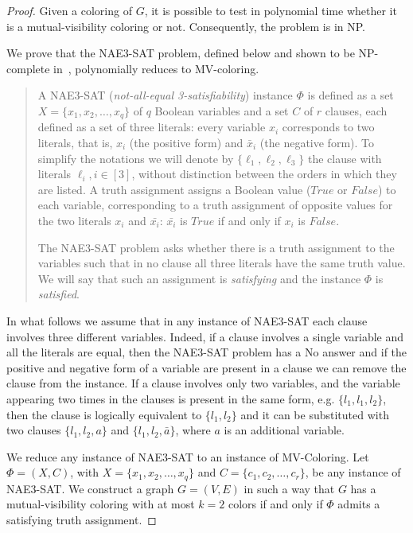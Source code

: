 \documentclass[12pt]{article}
\begin{document}
\begin{proof} 
 Given a coloring of $G$, it is possible to test in polynomial time whether it is a mutual-visibility coloring or not. Consequently, the problem is in NP. 
 
 We prove that the {\sc NAE3-SAT} problem, defined below and shown to be NP-complete in~\cite{schafer-1978}, polynomially reduces to {\sc MV-coloring}.
 \begin{quote}  
 A {\sc NAE3-SAT} (\emph{not-all-equal 3-satisfiability}) instance $\Phi$ is defined as a set $X=\{x_1,x_2,\ldots,x_q\}$ of $q$ Boolean variables and a set $C$ of $r$ clauses, each  defined as a set of three literals: every variable $x_i$ corresponds to two literals, that is, $x_i$ (the positive form) and $\bar x_i$ (the negative form). To simplify the notations we will denote by $\{\ell_1, \ell_2, \ell_3\}$ the clause with literals $\ell_i, i\in[3]$, without distinction between the orders in which they are listed. A truth assignment assigns a Boolean value ($True$ or $False$) to each variable, corresponding to a truth assignment of opposite values for the two literals $x_i$ and $\bar {x_i}$: $\bar{x_i}$ is $True$ if and only if $x_i$ is $False$. 
 
 The {\sc NAE3-SAT} problem asks whether there is a truth assignment to the variables such that in no clause all three literals have the same truth value. We will say that such an assignment is \emph{satisfying} and the instance $\Phi $ is \emph{satisfied}.
\end{quote}

In what follows we assume that in any instance of {\sc NAE3-SAT} each clause involves three different variables. Indeed, if a clause involves a single variable and all the literals are equal, then the {\sc NAE3-SAT} problem has a No answer and if the positive and negative form of a variable are present in a clause we can remove the clause from the instance.
If a clause involves only two variables, and the variable appearing two times in the clauses is present in the same form, e.g. $\{l_1,l_1,l_2\}$, then the clause is logically equivalent to $\{l_1,l_2\}$ and it can be substituted with two clauses $\{l_1,l_2, a\}$ and $\{l_1,l_2, \bar a\}$, where $a$ is an additional variable.

\bigskip

We reduce any instance of {\sc NAE3-SAT} to an instance of {\sc MV-Coloring}. Let $\Phi=(X,C)$, with $X = \{x_1,x_2,\ldots,x_q\}$
and $C = \{c_1,c_2,\ldots,c_r\}$, be any instance of {\sc NAE3-SAT}. We construct a graph $G = (V,E)$ in such a way that $G$ has a mutual-visibility coloring with at most $k=2$ colors if and only if $\Phi$ admits a satisfying truth assignment.


\end{proof}
\end{document}
